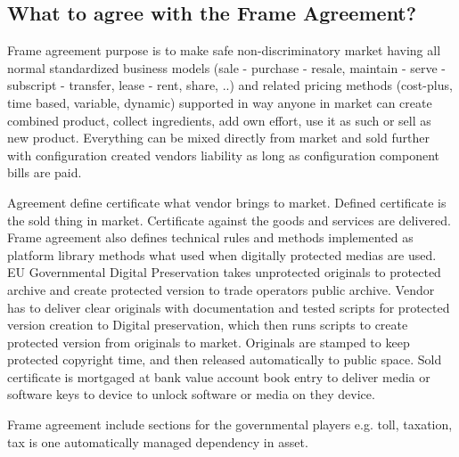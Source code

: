 \subsection{What to agree with the Frame Agreement?}
\label{frame_agreement_what}
Frame agreement purpose is to make safe non-discriminatory market having all
normal standardized business models (sale - purchase - resale, maintain -
serve - subscript - transfer, lease - rent, share, ..) and related pricing
methods (cost-plus, time based, variable, dynamic) supported in way anyone in
market can create combined product, collect ingredients, add own effort, use
it as such or sell as new product. Everything can be mixed directly from
market and sold further with configuration created vendors liability as long
as configuration component bills are paid.

Agreement define certificate what vendor brings to market. Defined
certificate is the sold thing in market. Certificate against the goods and
services are delivered. Frame agreement also defines technical rules and
methods implemented as platform library methods what used when digitally
protected medias are used. EU Governmental Digital Preservation takes
unprotected originals to protected archive and create protected version to
trade operators public archive. Vendor has to deliver clear originals with
documentation and tested scripts for protected version creation to Digital
preservation\cite{EULegalDepositScheme}, which then runs scripts to create
protected version from originals to market. Originals are stamped to keep
protected copyright time, and then released automatically to public space.
Sold certificate is mortgaged at bank value account book
entry\cite{BookEntry}\cite{LEX_2017/384}\cite{EU_Settlement} to deliver media
or software keys to device to unlock software or media on they device.

Frame agreement include sections for the governmental players e.g. toll,
taxation, tax is one automatically managed dependency in asset.


